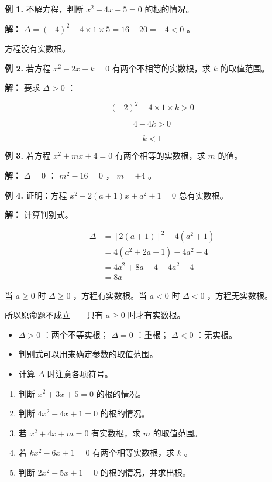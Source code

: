 \begin{workedexamples}


\textbf{例 1.} 不解方程，判断 $x^2 - 4x + 5 = 0$ 的根的情况。

\textbf{解：} $\Delta = (-4)^2 - 4 \times 1 \times 5 = 16 - 20 = -4 < 0$ 。

方程没有实数根。

\textbf{例 2.} 若方程 $x^2 - 2x + k = 0$ 有两个不相等的实数根，求 $k$ 的取值范围。

\textbf{解：} 要求 $\Delta > 0$ ：

\[
(-2)^2 - 4 \times 1 \times k > 0
\]


\[
4 - 4k > 0
\]


\[
k < 1
\]


\textbf{例 3.} 若方程 $x^2 + mx + 4 = 0$ 有两个相等的实数根，求 $m$ 的值。

\textbf{解：} $\Delta = 0$ ： $m^2 - 16 = 0$ ， $m = \pm 4$ 。

\textbf{例 4.} 证明：方程 $x^2 - 2(a + 1)x + a^2 + 1 = 0$ 总有实数根。

\textbf{解：} 计算判别式。

\[
\begin{aligned}
\Delta &= [2(a+1)]^2 - 4(a^2 + 1) \\
&= 4(a^2 + 2a + 1) - 4a^2 - 4 \\
&= 4a^2 + 8a + 4 - 4a^2 - 4 \\
&= 8a
\end{aligned}
\]


当 $a \geq 0$ 时 $\Delta \geq 0$ ，方程有实数根。当 $a < 0$ 时 $\Delta < 0$ ，方程无实数根。

所以原命题不成立——只有 $a \geq 0$ 时才有实数根。

\end{workedexamples}

\begin{keytakeaway}


\begin{itemize}
  \item $\Delta > 0$ ：两个不等实根； $\Delta = 0$ ：重根； $\Delta < 0$ ：无实根。
  \item 判别式可以用来确定参数的取值范围。
  \item 计算 $\Delta$ 时注意各项符号。
\end{itemize}


\end{keytakeaway}

\begin{practice}


\begin{enumerate}
  \item 判断 $x^2 + 3x + 5 = 0$ 的根的情况。
  \item 判断 $4x^2 - 4x + 1 = 0$ 的根的情况。
  \item 若 $x^2 + 4x + m = 0$ 有实数根，求 $m$ 的取值范围。
  \item 若 $kx^2 - 6x + 1 = 0$ 有两个相等实数根，求 $k$ 。
  \item 判断 $2x^2 - 5x + 1 = 0$ 的根的情况，并求出根。
\end{enumerate}


\end{practice}

